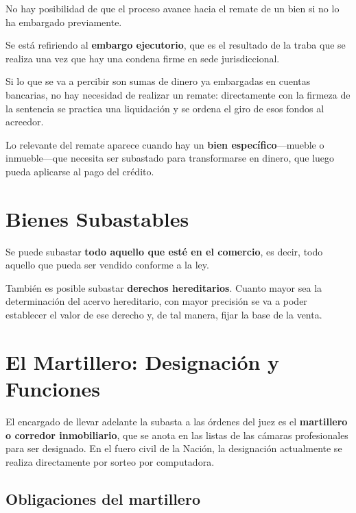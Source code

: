 \documentclass[12pt,oneside]{book}
\begin{document}
\begin{important}
No hay posibilidad de que el proceso avance hacia el remate de un bien si no lo ha embargado previamente.
\end{important}

Se está refiriendo al \textbf{embargo ejecutorio}, que es el resultado de la traba que se realiza una vez que hay una condena firme en sede jurisdiccional.

Si lo que se va a percibir son sumas de dinero ya embargadas en cuentas bancarias, no hay necesidad de realizar un remate: directamente con la firmeza de la sentencia se practica una liquidación y se ordena el giro de esos fondos al acreedor.

Lo relevante del remate aparece cuando hay un \textbf{bien específico}---mueble o inmueble---que necesita ser subastado para transformarse en dinero, que luego pueda aplicarse al pago del crédito.

\section{Bienes Subastables}

Se puede subastar \textbf{todo aquello que esté en el comercio}, es decir, todo aquello que pueda ser vendido conforme a la ley.

También es posible subastar \textbf{derechos hereditarios}. Cuanto mayor sea la determinación del acervo hereditario, con mayor precisión se va a poder establecer el valor de ese derecho y, de tal manera, fijar la base de la venta.

\section{El Martillero: Designación y Funciones}

El encargado de llevar adelante la subasta a las órdenes del juez es el \textbf{martillero o corredor inmobiliario}, que se anota en las listas de las cámaras profesionales para ser designado. En el fuero civil de la Nación, la designación actualmente se realiza directamente por sorteo por computadora.

\subsection{Obligaciones del martillero}
\end{document}
